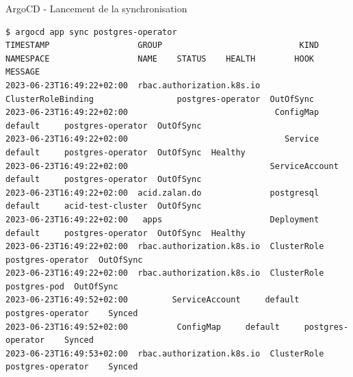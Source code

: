 \begin{frame}[fragile,shrink=1]{ArgoCD - Lancement de la synchronisation}

\begin{tiny}
\begin{Verbatim}[commandchars=\\\{\}]
$ argocd app sync postgres-operator
TIMESTAMP                  GROUP                            KIND           NAMESPACE                  NAME    STATUS    HEALTH        HOOK  MESSAGE                                           
2023-06-23T16:49:22+02:00  rbac.authorization.k8s.io  ClusterRoleBinding                 postgres-operator  OutOfSync                                                                         
2023-06-23T16:49:22+02:00                              ConfigMap             default     postgres-operator  OutOfSync                                                                         
2023-06-23T16:49:22+02:00                                Service             default     postgres-operator  OutOfSync  Healthy                                                                
2023-06-23T16:49:22+02:00                             ServiceAccount         default     postgres-operator  OutOfSync                                                                         
2023-06-23T16:49:22+02:00  acid.zalan.do              postgresql             default     acid-test-cluster  OutOfSync                                                                         
2023-06-23T16:49:22+02:00   apps                      Deployment             default     postgres-operator  OutOfSync  Healthy                                                                
2023-06-23T16:49:22+02:00  rbac.authorization.k8s.io  ClusterRole                        postgres-operator  OutOfSync                                                                         
2023-06-23T16:49:22+02:00  rbac.authorization.k8s.io  ClusterRole                             postgres-pod  OutOfSync                                                                         
2023-06-23T16:49:52+02:00         ServiceAccount     default     postgres-operator    Synced                                                                                                  
2023-06-23T16:49:52+02:00          ConfigMap     default     postgres-operator    Synced                                                                                                      
2023-06-23T16:49:53+02:00  rbac.authorization.k8s.io  ClusterRole                 postgres-operator    Synced                                                                                 

\end{Verbatim}
\end{tiny}
\end{frame}
